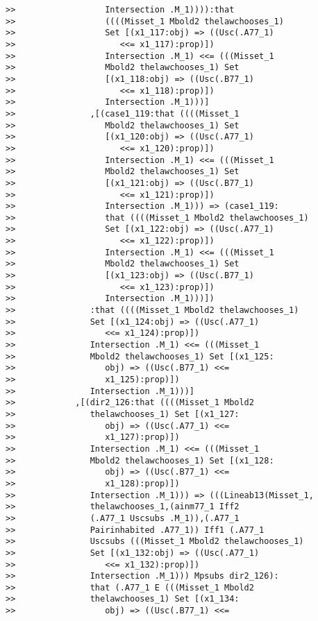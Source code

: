 \documentclass[12pt]{article}
\begin{document}
\begin{verbatim}
>>                  Intersection .M_1)))):that
>>                  ((((Misset_1 Mbold2 thelawchooses_1)
>>                  Set [(x1_117:obj) => ((Usc(.A77_1)
>>                     <<= x1_117):prop)])
>>                  Intersection .M_1) <<= (((Misset_1
>>                  Mbold2 thelawchooses_1) Set
>>                  [(x1_118:obj) => ((Usc(.B77_1)
>>                     <<= x1_118):prop)])
>>                  Intersection .M_1)))]
>>               ,[(case1_119:that ((((Misset_1
>>                  Mbold2 thelawchooses_1) Set
>>                  [(x1_120:obj) => ((Usc(.A77_1)
>>                     <<= x1_120):prop)])
>>                  Intersection .M_1) <<= (((Misset_1
>>                  Mbold2 thelawchooses_1) Set
>>                  [(x1_121:obj) => ((Usc(.B77_1)
>>                     <<= x1_121):prop)])
>>                  Intersection .M_1))) => (case1_119:
>>                  that ((((Misset_1 Mbold2 thelawchooses_1)
>>                  Set [(x1_122:obj) => ((Usc(.A77_1)
>>                     <<= x1_122):prop)])
>>                  Intersection .M_1) <<= (((Misset_1
>>                  Mbold2 thelawchooses_1) Set
>>                  [(x1_123:obj) => ((Usc(.B77_1)
>>                     <<= x1_123):prop)])
>>                  Intersection .M_1)))])
>>               :that ((((Misset_1 Mbold2 thelawchooses_1)
>>               Set [(x1_124:obj) => ((Usc(.A77_1)
>>                  <<= x1_124):prop)])
>>               Intersection .M_1) <<= (((Misset_1
>>               Mbold2 thelawchooses_1) Set [(x1_125:
>>                  obj) => ((Usc(.B77_1) <<=
>>                  x1_125):prop)])
>>               Intersection .M_1)))]
>>            ,[(dir2_126:that ((((Misset_1 Mbold2
>>               thelawchooses_1) Set [(x1_127:
>>                  obj) => ((Usc(.A77_1) <<=
>>                  x1_127):prop)])
>>               Intersection .M_1) <<= (((Misset_1
>>               Mbold2 thelawchooses_1) Set [(x1_128:
>>                  obj) => ((Usc(.B77_1) <<=
>>                  x1_128):prop)])
>>               Intersection .M_1))) => (((Lineab13(Misset_1,
>>               thelawchooses_1,(ainm77_1 Iff2
>>               (.A77_1 Uscsubs .M_1)),(.A77_1
>>               Pairinhabited .A77_1)) Iff1 (.A77_1
>>               Uscsubs (((Misset_1 Mbold2 thelawchooses_1)
>>               Set [(x1_132:obj) => ((Usc(.A77_1)
>>                  <<= x1_132):prop)])
>>               Intersection .M_1))) Mpsubs dir2_126):
>>               that (.A77_1 E (((Misset_1 Mbold2
>>               thelawchooses_1) Set [(x1_134:
>>                  obj) => ((Usc(.B77_1) <<=

\end{verbatim}
\end{document}

